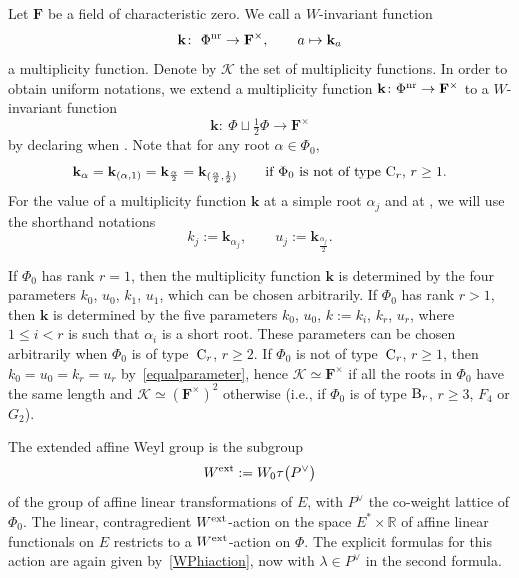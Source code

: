 \documentclass[pdftex]{sigma}
\numberwithin{equation}{section}
\begin{document}
Let $\mathbf{F}$ be a field of characteristic zero. We call a $W$-invariant function
\[
\mathbf{k}\colon\ \Phi^{\textup{nr}}\rightarrow\mathbf{F}^\times,\qquad a\mapsto \mathbf{k}_a
\]
a multiplicity function. Denote by $\mathcal{K}$ the set of multiplicity functions.
In order to obtain uniform notations, we extend a multiplicity function
$\mathbf{k}\colon \Phi^{\textup{nr}}\rightarrow\mathbf{F}^\times$ to a $W$-invariant function
\[
\mathbf{k}\colon\ \Phi\sqcup\tfrac{1}{2}\Phi\rightarrow\mathbf{F}^\times
\]
by declaring  when . Note that for any root $\alpha\in\Phi_0$,
\begin{equation}
\label{equalparameter}
\mathbf{k}_\alpha=\mathbf{k}_{(\alpha,1)}=\mathbf{k}_{\frac{\alpha}{2}}=\mathbf{k}_{(\frac{\alpha}{2},\frac{1}{2})}\qquad \textup{if $\Phi_0$ is not of type ${\rm C}_r$, $r\geq 1$}.
\end{equation}
For the value of a multiplicity function $\mathbf{k}$ at a simple root $\alpha_j$ and at , we will use the shorthand notations
\[
k_j:=\mathbf{k}_{\alpha_j},\qquad u_j:=\mathbf{k}_{\frac{\alpha_j}{2}}.
\]

If $\Phi_0$ has rank $r=1$, then
the multiplicity function $\mathbf{k}$ is determined by the four parameters $k_0$, $u_0$, $k_1$, $u_1$, which can be chosen arbitrarily.
If $\Phi_0$ has rank $r>1$, then $\mathbf{k}$ is determined by the five parameters $k_0$, $u_0$, $k:=k_i$, $k_r$, $u_r$, where $1\leq i<r$ is such that $\alpha_i$ is a short root. These parameters can be chosen arbitrarily
when $\Phi_0$ is of type~${\rm C}_r$, $r\geq 2$. If $\Phi_0$ is not of type~${\rm C}_r$, $r\geq 1$,
then $k_0=u_0=k_r=u_r$ by~\eqref{equalparameter}, hence $\mathcal{K}\simeq\mathbf{F}^\times$ if all the roots in $\Phi_0$ have the same length and $\mathcal{K}\simeq (\mathbf{F}^\times)^2$ otherwise (i.e., if $\Phi_0$ is of type $\textup{B}_r$, $r\geq 3$, $F_4$ or $G_2$).

The extended affine Weyl group is the subgroup
\[
W^{\textup{ext}}:=W_0\tau\bigl(P^\vee\bigr)
\]
of the group of affine linear transformations of $E$,
with $P^\vee$ the co-weight lattice of $\Phi_0$. The linear, contragredient $W^{\textup{ext}}$-action on the space $E^*\times\mathbb{R}$ of affine linear functionals on $E$ restricts to a $W^{\textup{ext}}$-action on $\Phi$. The explicit formulas for this action are again given by~\eqref{WPhiaction}, now with $\lambda\in P^\vee$ in the second formula.
\end{document}
